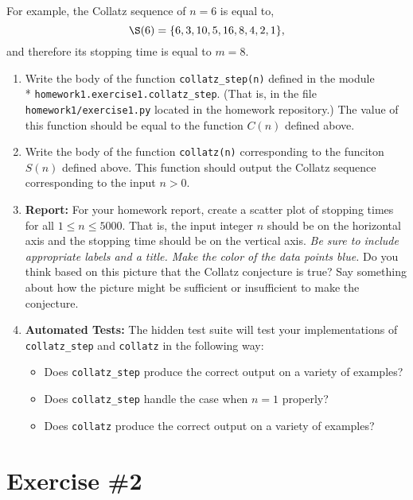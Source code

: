 \documentclass[12pt]{article}
\begin{document}
For example, the Collatz sequence of $n=6$ is equal to,
\[
  \S(6) = \{6, 3, 10, 5, 16, 8, 4, 2, 1\},
\]
and therefore its stopping time is equal to $m=8$.
\begin{enumerate}
\item Write the body of the function {\tt collatz\_step(n)} defined in the
  module \\* {\tt homework1.exercise1.collatz\_step}. (That is, in the file {\tt
    homework1/exercise1.py} located in the homework repository.) The value of
  this function should be equal to the function $C(n)$ defined above.
\item Write the body of the function {\tt collatz(n)} corresponding to the
  funciton $S(n)$ defined above. This function should output the Collatz
  sequence corresponding to the input $n > 0$.
\item {\bf Report:} For your homework report, create a scatter plot of stopping
  times for all $1 \leq n \leq 5000$. That is, the input integer $n$ should be
  on the horizontal axis and the stopping time should be on the vertical axis.
  {\it Be sure to include appropriate labels and a title. Make the color of the
    data points blue.} Do you think based on this picture that the Collatz
  conjecture is true? Say something about how the picture might be sufficient or
  insufficient to make the conjecture.
\item {\bf Automated Tests:} The hidden test suite will test your
  implementations of {\tt collatz\_step} and {\tt collatz} in the following way:
  \begin{itemize}
  \item Does {\tt collatz\_step} produce the correct output on a variety of
    examples?
  \item Does {\tt collatz\_step} handle the case when $n = 1$ properly?
  \item Does {\tt collatz} produce the correct output on a variety of examples?
  \end{itemize}
\end{enumerate}


\section*{Exercise \#2}
\end{document}
